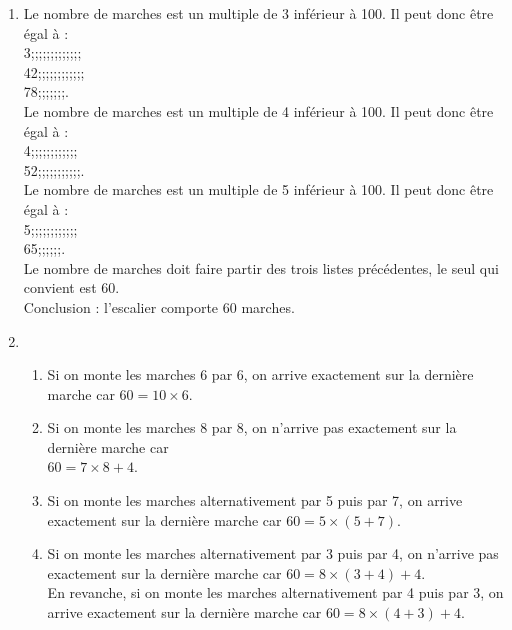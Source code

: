 \begin{colonne*exercice}
\begin{corrige}
\begin{enumerate}
      \item Le nombre de marches est un multiple de 3 inférieur à 100. Il peut donc être égal à : \\
      3;;;;;;;;;;;;;\\
      42;;;;;;;;;;;;\\
      78;;;;;;;. \\
      Le nombre de marches est un multiple de 4 inférieur à 100. Il peut donc être égal à : \\
      4;;;;;;;;;;;;\\
      52;;;;;;;;;;;. \\
      Le nombre de marches est un multiple de 5 inférieur à 100. Il peut donc être égal à : \\
      5;;;;;;;;;;;;\\  
      65;;;;;;. \\
      Le nombre de marches doit faire partir des trois listes précédentes, le seul qui convient est 60. \\
      Conclusion : {\blue l'escalier comporte 60 marches}.
      \item 
      \begin{enumerate}
         \item Si on monte les marches 6 par 6, {\blue on arrive exactement sur la dernière marche} car $60 =10\times6$.
         \item Si on monte les marches 8 par 8, {\blue on n'arrive pas exactement sur la dernière marche} car \\
            $60 =7\times8+4$.
         \item Si on monte les marches alternativement par 5 puis par 7, {\blue on arrive exactement sur la dernière marche} car $60 =5\times(5+7)$.
         \item Si on monte les marches alternativement par 3 puis par 4, {\blue on n'arrive pas exactement sur la dernière marche} car $60 =8\times(3+4)+4$. \\
         En revanche, si on monte les marches alternativement par 4 puis par 3, {\blue on arrive exactement sur la dernière marche} car $60 =8\times(4+3)+4$.
      \end{enumerate}
   \end{enumerate}  
\end{corrige}
\vspace*{-2mm}

\end{colonne*exercice}


